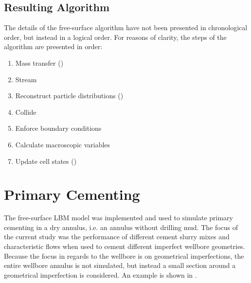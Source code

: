 \documentclass[pdftex,ms]{pittetd}
\begin{document}
\subsection{Resulting Algorithm}

The details of the free-surface algorithm have not been presented in chronological order, but instead in a logical order.
For reasons of clarity, the steps of the algorithm are presented in order:
\begin{enumerate}
\item Mass transfer ()
\item Stream
\item Reconstruct particle distributions ()
\item Collide
\item Enforce boundary conditions
\item Calculate macroscopic variables
\item Update cell states ()
\end{enumerate}

\newcommand{\nodesi}{50}
\newcommand{\nodesj}{500}
\newcommand{\anw}{$1\frac{1}{4}$"}
\newcommand{\anh}{1'}
\newcommand{\nsteps}{16000}

\section{Primary Cementing} \label{sec:results}

The free-surface LBM model was implemented and used to simulate primary cementing in a dry annulus, i.e. an annulus without drilling mud.
The focus of the current study was the performance of different cement slurry mixes and characteristic flows when used to cement different imperfect wellbore geometries.
Because the focus in regards to the wellbore is on geometrical imperfections, the entire wellbore annulus is not simulated, but instead a small section around a geometrical imperfection is considered.
An example is shown in .
\end{document}
